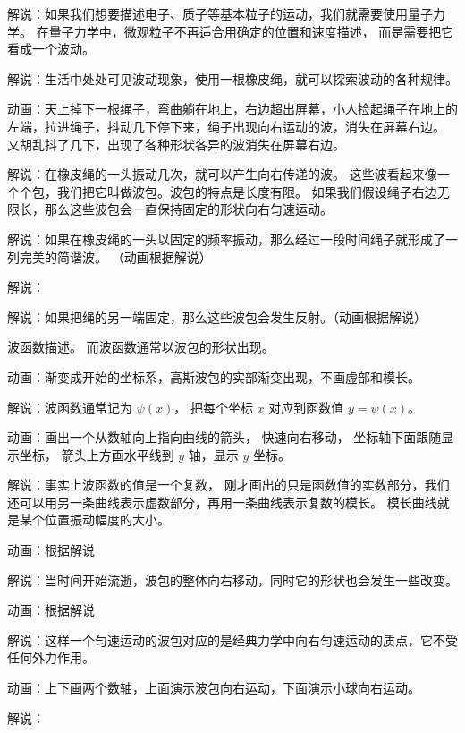 解说：如果我们想要描述电子、质子等基本粒子的运动，我们就需要使用量子力学。 在量子力学中，微观粒子不再适合用确定的位置和速度描述， 而是需要把它看成一个波动。

解说：生活中处处可见波动现象，使用一根橡皮绳，就可以探索波动的各种规律。

动画：天上掉下一根绳子，弯曲躺在地上，右边超出屏幕，小人捡起绳子在地上的左端，拉进绳子，抖动几下停下来，绳子出现向右运动的波，消失在屏幕右边。 又胡乱抖了几下，出现了各种形状各异的波消失在屏幕右边。

解说：在橡皮绳的一头振动几次，就可以产生向右传递的波。 这些波看起来像一个个包，我们把它叫做波包。波包的特点是长度有限。 如果我们假设绳子右边无限长，那么这些波包会一直保持固定的形状向右匀速运动。

解说：如果在橡皮绳的一头以固定的频率振动，那么经过一段时间绳子就形成了一列完美的简谐波。
（动画根据解说）

解说：

解说：如果把绳的另一端固定，那么这些波包会发生反射。（动画根据解说）




波函数描述。 而波函数通常以波包的形状出现。

动画：渐变成开始的坐标系，高斯波包的实部渐变出现，不画虚部和模长。

解说：波函数通常记为 $\psi(x)$， 把每个坐标 $x$ 对应到函数值 $y = \psi(x)$。

动画：画出一个从数轴向上指向曲线的箭头， 快速向右移动， 坐标轴下面跟随显示坐标， 箭头上方画水平线到 $y$ 轴，显示 $y$ 坐标。

解说：事实上波函数的值是一个复数， 刚才画出的只是函数值的实数部分，我们还可以用另一条曲线表示虚数部分，再用一条曲线表示复数的模长。 模长曲线就是某个位置振动幅度的大小。

动画：根据解说

解说：当时间开始流逝，波包的整体向右移动，同时它的形状也会发生一些改变。

动画：根据解说

解说：这样一个匀速运动的波包对应的是经典力学中向右匀速运动的质点，它不受任何外力作用。

动画：上下画两个数轴，上面演示波包向右运动，下面演示小球向右运动。

解说：
